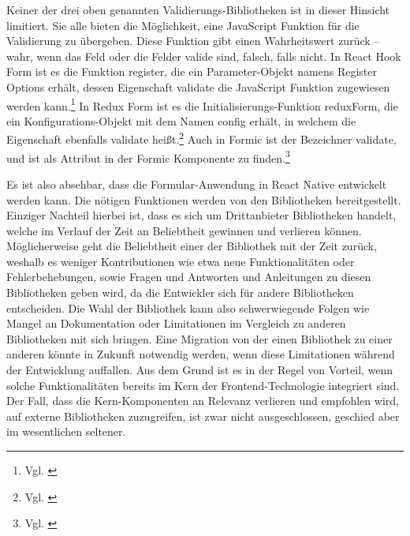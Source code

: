 Keiner der drei oben genannten Validierungs-Bibliotheken ist in dieser Hinsicht limitiert. Sie alle bieten die Möglichkeit, eine JavaScript Funktion für die Validierung zu übergeben. Diese Funktion gibt einen Wahrheitswert zurück – wahr, wenn das Feld oder die Felder valide sind, falsch, falls nicht. In React Hook Form ist es die Funktion register, die ein Parameter-Objekt namens Register Options erhält, dessen Eigenschaft validate die JavaScript Funktion zugewiesen werden kann.\footnote{Vgl. \cite{RegisterReactHookFormAPI}}
In Redux Form ist es die Initialisierungs-Funktion reduxForm, die ein Konfigurations-Objekt mit dem Namen config erhält, in welchem die Eigenschaft ebenfalls validate heißt.\footnote{Vgl. \cite{ReduxFormReduxFormAPI}}
Auch in Formic ist der Bezeichner validate, und ist als Attribut in der Formic Komponente  zu finden.\footnote{Vgl. \cite{FormikComponentFormikDocsAPI}}


Es ist also absehbar, dass die Formular-Anwendung in React Native entwickelt werden kann. Die nötigen Funktionen werden von den Bibliotheken bereitgestellt. Einziger Nachteil hierbei ist, dass es sich um Drittanbieter Bibliotheken handelt, welche im Verlauf der Zeit an Beliebtheit gewinnen und verlieren können. Möglicherweise geht die Beliebtheit einer der Bibliothek mit der Zeit zurück, weshalb es weniger Kontributionen wie etwa neue Funktionalitäten oder Fehlerbehebungen, sowie Fragen und Antworten  und Anleitungen zu diesen Bibliotheken geben wird, da die Entwickler sich für andere Bibliotheken entscheiden. Die Wahl der Bibliothek kann also schwerwiegende Folgen wie Mangel an Dokumentation oder Limitationen im Vergleich zu anderen Bibliotheken mit sich bringen. Eine Migration von der einen Bibliothek zu einer anderen könnte in Zukunft notwendig werden, wenn diese Limitationen während der Entwicklung auffallen. Aus dem Grund ist es in der Regel von Vorteil, wenn solche Funktionalitäten bereits im Kern der Frontend-Technologie integriert sind. Der Fall, dass die Kern-Komponenten an Relevanz verlieren und empfohlen wird, auf externe Bibliotheken zuzugreifen, ist zwar nicht ausgeschlossen, geschied aber im wesentlichen seltener.



















